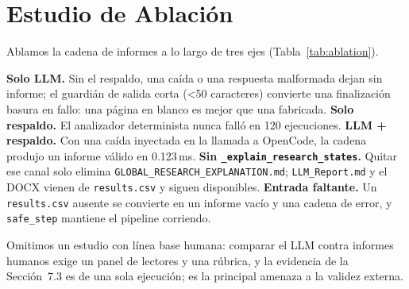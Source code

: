 \documentclass[10pt,twocolumn,letterpaper]{article}
\begin{document}
\section{Estudio de Ablación}
Ablamos la cadena de informes a lo largo de tres ejes (Tabla~\ref{tab:ablation}).

\begin{table}[htbp]
\centering
\caption{Ablación de la cadena de informes (seis archivos (tres conjuntos de datos únicos), 20 ensayos cada uno salvo indicación)}
\label{tab:ablation}
\end{table}

\textbf{Solo LLM.} Sin el respaldo, una caída o una respuesta malformada dejan sin informe; el guardián de salida corta (\textless{}50 caracteres) convierte una finalización basura en fallo: una página en blanco es mejor que una fabricada. \textbf{Solo respaldo.} El analizador determinista nunca falló en 120 ejecuciones. \textbf{LLM + respaldo.} Con una caída inyectada en la llamada a OpenCode, la cadena produjo un informe válido en 0.123\,ms. \textbf{Sin \texttt{\_explain\_research\_states}.} Quitar ese canal solo elimina \texttt{GLOBAL\_RESEARCH\_EXPLANATION.md}; \texttt{LLM\_Report.md} y el DOCX vienen de \texttt{results.csv} y siguen disponibles. \textbf{Entrada faltante.} Un \texttt{results.csv} ausente se convierte en un informe vacío y una cadena de error, y \texttt{safe\_step} mantiene el pipeline corriendo.

Omitimos un estudio con línea base humana: comparar el LLM contra informes humanos exige un panel de lectores y una rúbrica, y la evidencia de la Sección~7.3 es de una sola ejecución; es la principal amenaza a la validez externa.
\end{document}
